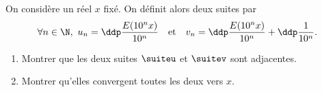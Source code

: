 \begin{exercice}
On consid\`{e}re un r\'eel $x$ fix\'e. On d\'efinit alors deux suites par
$$\forall n\in\N,\ u_n=\ddp\frac{E(10^n x)}{10^n}\quad \hbox{et}\quad v_n=\ddp\frac{E(10^n x)}{10^n}+\ddp\frac{1}{10^n}.$$
\begin{enumerate}
\item Montrer que les deux suites $\suiteu$ et $\suitev$ sont adjacentes.
\item Montrer qu'elles convergent toutes les deux vers $x$.
\end{enumerate}
\end{exercice}


